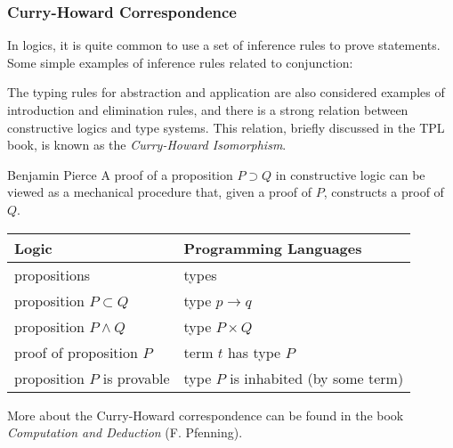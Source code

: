 \documentclass{beamer}
\begin{document}
\begin{frame}
\frametitle{Curry-Howard Correspondence} 

In logics, it is quite common to use a 
set of inference rules to prove statements. 
Some simple examples of inference rules 
related to conjunction: 

\begin{prooftree}
\end{prooftree}


\begin{prooftree}
\end{prooftree}


\begin{prooftree}
\end{prooftree}


\end{frame}

\begin{frame}

The typing rules for abstraction and 
application are also considered examples of 
introduction and elimination rules\pause, and  
there is a strong relation between constructive 
logics and type systems. This relation, briefly 
discussed in the TPL book, is known as the 
\emph{Curry-Howard Isomorphism}. \pause 

\begin{shadequote}[l]{Benjamin Pierce}
A proof of a proposition $P \supset Q$ in 
constructive logic can be viewed as a mechanical 
procedure that, given a proof of $P$, constructs a 
proof of $Q$. 
\end{shadequote}

\end{frame}

\begin{frame}
\begin{center}
\begin{tabular}{ll} \hline
Logic & Programming Languages \\ \hline \hline 
propositions & types \\
proposition $P \subset Q$ & type $p \rightarrow q$ \\
proposition $P \wedge Q$ & type $P \times Q$ \\
proof of proposition $P$ & term $t$ has type $P$ \\
proposition $P$ is provable & type $P$ is inhabited (by some term) \\ \hline
\end{tabular}
\end{center} \pause 

More about the Curry-Howard correspondence can be found  
in the book \emph{Computation and Deduction} (F. Pfenning). 
  
\end{frame} 
\begin{frame}
 \titlepage
\end{frame}
\end{document}
